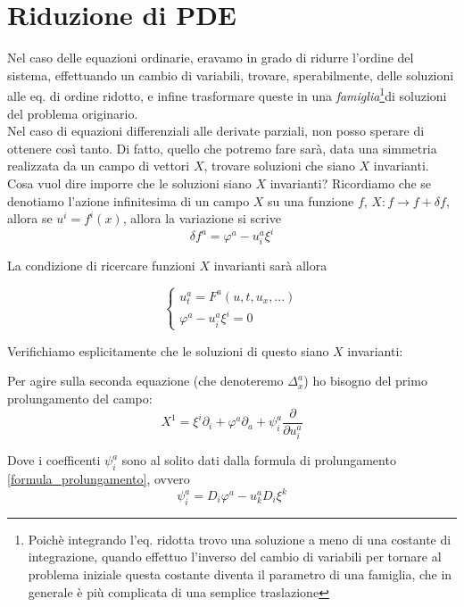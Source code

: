 \documentclass{report}
\begin{document}
\section{Riduzione di PDE}

Nel caso delle equazioni ordinarie, eravamo in grado di ridurre l'ordine del sistema, effettuando un cambio di variabili, trovare, sperabilmente, delle soluzioni alle eq. di ordine ridotto, e infine trasformare queste in una \emph{famiglia}\footnote{Poichè integrando l'eq. ridotta trovo una soluzione  a meno di una costante di integrazione, quando effettuo l'inverso del cambio di variabili per tornare al problema iniziale questa costante diventa il parametro di una famiglia, che in generale è più complicata di una semplice traslazione}di soluzioni del problema originario. \\

Nel caso di equazioni differenziali alle derivate parziali, non posso sperare di ottenere così tanto. Di fatto, quello che potremo fare sarà, data una simmetria realizzata da un campo di vettori $X$, trovare soluzioni che siano $X$ invarianti. \\

Cosa vuol dire imporre che le soluzioni siano $X$ invarianti? Ricordiamo che se denotiamo l'azione infinitesima di un campo $X$ su una funzione $f$, $X: f \rightarrow f +\delta f$, allora se $u^i = f^i(x)$, allora la variazione si scrive 
\begin{equation}
    \delta f^a = \varphi^a - u_i^a\xi^i
\end{equation}

La condizione di ricercare funzioni $X$ invarianti sarà allora 

\[\begin{cases}
    u_t^a = F^a(u, t, u_x, ...) \\ \varphi^a - u_i^a\xi^i = 0 
\end{cases}\]

Verifichiamo esplicitamente che le soluzioni di questo siano $X$ invarianti: 

Per agire sulla seconda equazione (che denoteremo $\Delta_x^a$) ho bisogno del primo prolungamento del campo: 
\begin{equation}
    X^1 = \xi^i \partial_i + \varphi^a\partial_a + \psi^a_i\frac{\partial}{\partial u^a_i}
\end{equation}

Dove i coefficenti $\psi^a_i$ sono al solito dati dalla formula di prolungamento \ref{formula_prolungamento}, ovvero 
\begin{equation}
    \psi^a_i = D_i\varphi^a - u^a_k D_i\xi^k
\end{equation}
\end{document}
